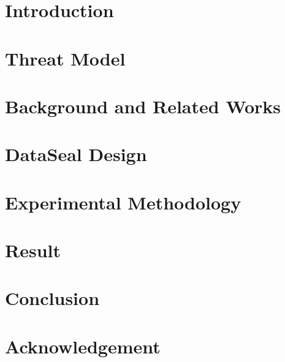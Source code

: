 \documentclass[conference,compsoc]{IEEEtran}
\begin{document}





\IEEEpeerreviewmaketitle

\section{Introduction}


%
\section{Threat Model}


\section{Background and Related Works}


% 
\section{DataSeal Design}\label{sec:design}


\section{Experimental Methodology}


\section{Result}



\section{Conclusion}


\section{Acknowledgement}








%




\end{document}
